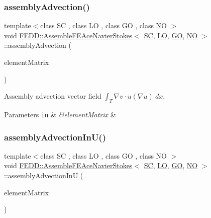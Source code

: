 \subsubsection{\texorpdfstring{assembly\+Advection()}{assemblyAdvection()}}
{\footnotesize\ttfamily template$<$class SC , class LO , class GO , class NO $>$ \\
void \hyperlink{classFEDD_1_1AssembleFEAceNavierStokes}{F\+E\+D\+D\+::\+Assemble\+F\+E\+Ace\+Navier\+Stokes}$<$ \hyperlink{fe__test__laplace_8cpp_a79c7e86a57edbb2a5a53242bcd04e41e}{SC}, \hyperlink{fe__test__laplace_8cpp_ad6a38c9f07d3fd633eefca5bccad8410}{LO}, \hyperlink{fe__test__laplace_8cpp_afa2946b509009b4f45eb04bd8c5b27d9}{GO}, \hyperlink{fe__test__laplace_8cpp_a5e24f37b28787429872b6ecb1d0417ce}{NO} $>$\+::assembly\+Advection (\begin{DoxyParamCaption}\item[{\hyperlink{classFEDD_1_1AssembleFE_afb5fb5dca3aab59f697a25884e99e894}{Small\+Matrix\+Ptr\+\_\+\+Type} \&}]{element\+Matrix }\end{DoxyParamCaption})\hspace{0.3cm}{\ttfamily [private]}}



Assembly advection vector field $ \int_T \nabla v \cdot u(\nabla u) ~dx$. 


\begin{DoxyParams}[1]{Parameters}
\mbox{\tt in}  & {\em \&element\+Matrix} & \\
\hline
\end{DoxyParams}
\mbox{\label{classFEDD_1_1AssembleFEAceNavierStokes_a43e917f0b7509f8e95b0136af7876405}} 
\subsubsection{\texorpdfstring{assembly\+Advection\+In\+U()}{assemblyAdvectionInU()}}
{\footnotesize\ttfamily template$<$class SC , class LO , class GO , class NO $>$ \\
void \hyperlink{classFEDD_1_1AssembleFEAceNavierStokes}{F\+E\+D\+D\+::\+Assemble\+F\+E\+Ace\+Navier\+Stokes}$<$ \hyperlink{fe__test__laplace_8cpp_a79c7e86a57edbb2a5a53242bcd04e41e}{SC}, \hyperlink{fe__test__laplace_8cpp_ad6a38c9f07d3fd633eefca5bccad8410}{LO}, \hyperlink{fe__test__laplace_8cpp_afa2946b509009b4f45eb04bd8c5b27d9}{GO}, \hyperlink{fe__test__laplace_8cpp_a5e24f37b28787429872b6ecb1d0417ce}{NO} $>$\+::assembly\+Advection\+InU (\begin{DoxyParamCaption}\item[{\hyperlink{classFEDD_1_1AssembleFE_afb5fb5dca3aab59f697a25884e99e894}{Small\+Matrix\+Ptr\+\_\+\+Type} \&}]{element\+Matrix }\end{DoxyParamCaption})\hspace{0.3cm}{\ttfamily [private]}}



